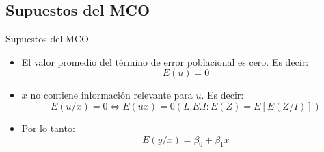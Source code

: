 \subsection{Supuestos del MCO}
\begin{frame}{Supuestos del MCO}
	\begin{itemize}
		\item El valor promedio del término de error poblacional es cero. Es decir:\pause
		$$E(u)=0$$ \pause
		\item $x$ no contiene información relevante para $u$. Es decir: \pause
		$$E(u/x)=0 \Leftrightarrow E(ux)=0 (L.E.I: E(Z)=E[E(Z/I)])$$ \pause
		\item Por lo tanto: \pause
		$$E(y/x)=\beta_{0}+\beta_{1}x$$
	\end{itemize}
\end{frame}

